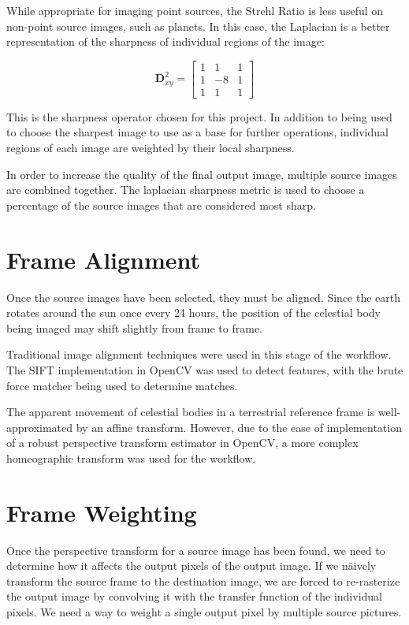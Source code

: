 \documentclass[conference]{IEEEtran}
\begin{document}
While appropriate for imaging point sources, the Strehl Ratio is less
useful on non-point source images, such as planets. In this case, the
Laplacian is a better representation of the sharpness of individual
regions of the image: 

\begin{equation}
  \mathbf{D}^2_{xy} =
  \begin{bmatrix}
    1 & 1 & 1 \\
    1 & -8 & 1 \\
    1 & 1 & 1
    \end{bmatrix}
\end{equation}

This is the sharpness operator chosen for this project. In addition to
being used to choose the sharpest image to use as a base for further
operations, individual regions of each image are weighted by their
local sharpness.

In order to increase the quality of the final output image, multiple
source images are combined together. The laplacian sharpness metric is
used to choose a percentage of the source images that are considered
most sharp. 

\section{Frame Alignment}
Once the source images have been selected, they must be aligned. Since
the earth rotates around the sun once every 24 hours\cite{copernicus},
the position of the celestial body being imaged may shift slightly
from frame to frame.

Traditional image alignment techniques were used in this stage of the
workflow. The SIFT implementation\cite{SIFT} in
OpenCV\cite{opencv_library} was used to detect features, with the
brute force matcher being used to determine matches.

The apparent movement of celestial bodies in a terrestrial reference
frame is well-approximated by an affine transform. However, due to the
ease of implementation of a robust perspective transform estimator in
OpenCV, a more complex homeographic transform was used for the
workflow.

\section{Frame Weighting}
Once the perspective transform for a source image has been found, we
need to determine how it affects the output pixels of the output
image.  If we n\"aively transform the source frame to the destination
image, we are forced to re-rasterize the output image by convolving it
with the transfer function of the individual pixels. We need a way to
weight a single output pixel by multiple source pictures.
\end{document}
